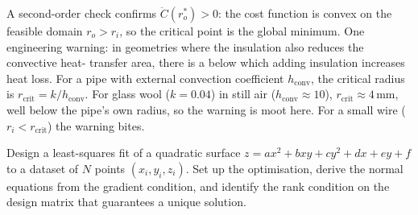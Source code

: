 \begin{exercise}
A second-order check confirms $\ddot{C}(r_{o}^{*}) > 0$: the cost
function is convex on the feasible domain $r_{o} > r_{i}$, so the
critical point is the global minimum. One engineering warning: in
geometries where the insulation also reduces the convective heat-
transfer area, there is a 
below which adding insulation increases heat loss. For a pipe with
external convection coefficient $h_{\text{conv}}$, the critical
radius is $r_{\text{crit}} = k/h_{\text{conv}}$. For glass wool
($k = 0.04$) in still air ($h_{\text{conv}} \approx 10$), $r_{\text{
crit}} \approx 4\,\si{\milli\meter}$, well below the pipe's own
radius, so the warning is moot here. For a small wire ($r_{i} <
r_{\text{crit}}$) the warning bites.
\end{exercise}

\begin{exercise}
Design a least-squares fit of a quadratic surface $z = a x^{2} +
b x y + c y^{2} + d x + e y + f$ to a dataset of $N$ points
$(x_{i}, y_{i}, z_{i})$. Set up the optimisation, derive the normal
equations from the gradient condition, and identify the rank
condition on the design matrix that guarantees a unique solution.


\end{exercise}

